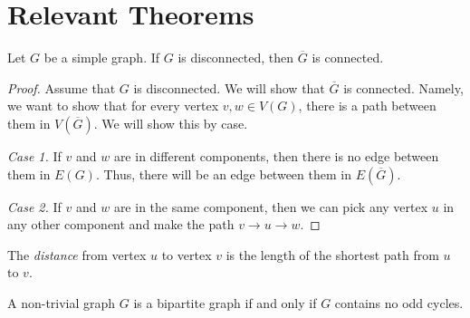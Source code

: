 \section{Relevant Theorems}

\begin{theorem}
  Let \(G\) be a simple graph. If \(G\) is disconnected, then \(\overline{G}\) is connected.
\end{theorem}

\begin{proof}
  Assume that \(G\) is disconnected. We will show that \(\overline{G}\) is
  connected. Namely, we want to show that for every vertex \(v, w \in
  V({G})\), there is a path between them in \(V(\overline{G})\). We will show
  this by case.

  \textit{Case 1.} If \(v\) and \(w\) are in different components, then there
  is no edge between them in \(E(G)\). Thus, there will be an edge between them
  in \(E(\overline{G})\).

  \textit{Case 2.} If \(v\) and \(w\) are in the same component, then we can
  pick any vertex \(u\) in any other component and make the path \(v \to u \to
  w\).
\end{proof}

\begin{definition}[Distance]
  The \textit{distance} from vertex \(u\) to vertex \(v\) is the length of the
  shortest path from \(u\) to \(v\).
\end{definition}

\begin{theorem}
  A non-trivial graph \(G\) is a bipartite graph if and only if \(G\) contains
  no odd cycles.
\end{theorem}

